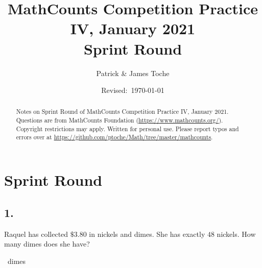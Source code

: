 \documentclass[12pt]{article}
\title{MathCounts Competition Practice IV, January 2021 \\ Sprint Round}
\author{Patrick \& James Toche}
\date{Revised:~\today}
\begin{document}
\maketitle
\begin{minipage}{\textwidth}
\begin{abstract}\setlength{\parindent}{0pt}%
Notes on Sprint Round of MathCounts Competition Practice IV, January 2021. 
Questions are from MathCounts Foundation (\url{https://www.mathcounts.org/}). Copyright restrictions may apply. Written for personal use. 
Please report typos and errors over at \url{https://github.com/ptoche/Math/tree/master/mathcounts}. 
\end{abstract}
\end{minipage}

\thispagestyle{empty}
\clearpage
\addtocounter{page}{-1}

\section*{Sprint Round}


\subsection*{1.}
Raquel has collected $\$3.80$ in nickels and dimes. She has exactly $48$ nickels. How many dimes does she have?

\nopagebreak

\fbox{\phantom{ANSWER}}~dimes

\begin{answer}
%
\end{answer}
\end{document}
